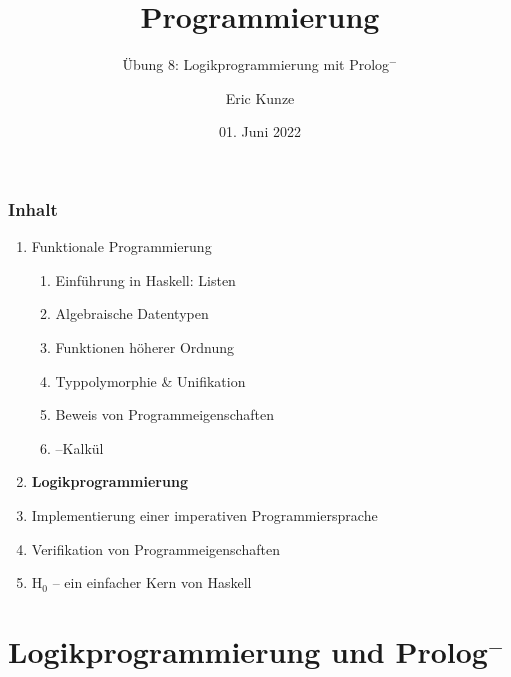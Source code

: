 \documentclass{beamer}
\begin{document}
	
	\title{Programmierung}
	\subtitle{Übung 8: Logikprogrammierung mit Prolog${}^-$}
	\author{Eric Kunze}
	\date{01. Juni 2022}
	
	\maketitle
	


\begin{frame}[fragile] \frametitle{Inhalt}
	\begin{enumerate}
		\item Funktionale Programmierung
		\begin{enumerate}
			\item Einführung in Haskell: Listen
			\item Algebraische Datentypen
			\item Funktionen höherer Ordnung
			\item Typpolymorphie \& Unifikation
			\item Beweis von Programmeigenschaften
			\item \textlambda--Kalkül
		\end{enumerate}
		\item \textbf{Logikprogrammierung}
		\item Implementierung einer imperativen Programmiersprache
		\item Verifikation von Programmeigenschaften
		\item H${}_\text{0}$ -- ein einfacher Kern von Haskell
	\end{enumerate}
\end{frame}


\section{Logikprogrammierung und Prolog${}^-$}
\end{document}
